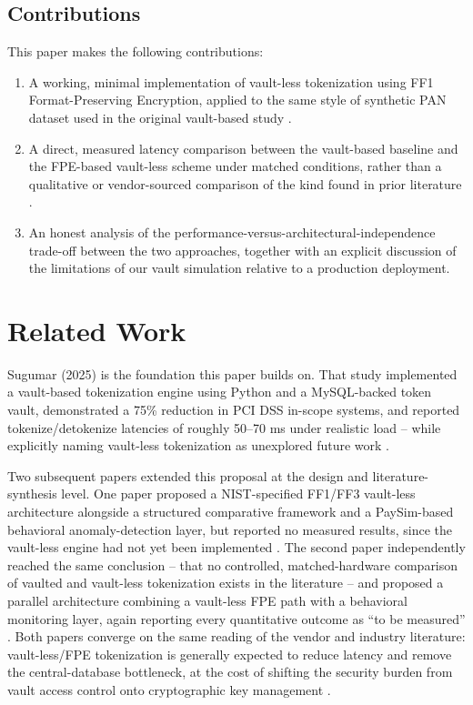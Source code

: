 \documentclass[conference]{IEEEtran}
\begin{document}
\subsection{Contributions}
This paper makes the following contributions:
\begin{enumerate}
\item A working, minimal implementation of vault-less tokenization using FF1 Format-Preserving Encryption, applied to the same style of synthetic PAN dataset used in the original vault-based study \cite{b1}.
\item A direct, measured latency comparison between the vault-based baseline and the FPE-based vault-less scheme under matched conditions, rather than a qualitative or vendor-sourced comparison of the kind found in prior literature \cite{b2,b3}.
\item An honest analysis of the performance-versus-architectural-independence trade-off between the two approaches, together with an explicit discussion of the limitations of our vault simulation relative to a production deployment.
\end{enumerate}

\section{Related Work}
Sugumar (2025) is the foundation this paper builds on. That study implemented a vault-based tokenization engine using Python and a MySQL-backed token vault, demonstrated a 75\% reduction in PCI DSS in-scope systems, and reported tokenize/detokenize latencies of roughly 50--70 ms under realistic load -- while explicitly naming vault-less tokenization as unexplored future work \cite{b1}.

Two subsequent papers extended this proposal at the design and literature-synthesis level. One paper proposed a NIST-specified FF1/FF3 vault-less architecture alongside a structured comparative framework and a PaySim-based behavioral anomaly-detection layer, but reported no measured results, since the vault-less engine had not yet been implemented \cite{b2}. The second paper independently reached the same conclusion -- that no controlled, matched-hardware comparison of vaulted and vault-less tokenization exists in the literature -- and proposed a parallel architecture combining a vault-less FPE path with a behavioral monitoring layer, again reporting every quantitative outcome as ``to be measured'' \cite{b3}. Both papers converge on the same reading of the vendor and industry literature: vault-less/FPE tokenization is generally expected to reduce latency and remove the central-database bottleneck, at the cost of shifting the security burden from vault access control onto cryptographic key management \cite{b2,b3}.
\end{document}
